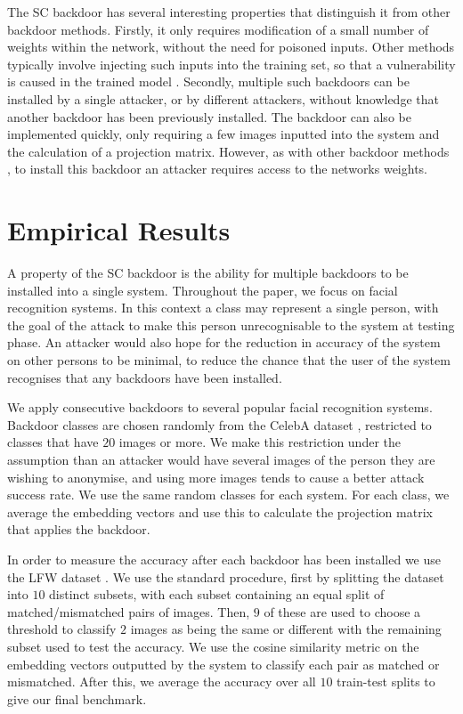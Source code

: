 \documentclass{article}
\theoremstyle{plain}
\theoremstyle{definition}
\theoremstyle{remark}
\begin{document}
The SC backdoor has several interesting properties that distinguish it from other backdoor methods. Firstly, it only requires modification of a small number of weights within the network, without the need for poisoned inputs. Other methods typically involve injecting such inputs into the training set, so that a vulnerability is caused in the trained model . Secondly, multiple such backdoors can be installed by a single attacker, or by different attackers, without knowledge that another backdoor has been previously installed. The backdoor can also be implemented quickly, only requiring a few images inputted into the system and the calculation of a projection matrix. However, as with other backdoor methods , to install this backdoor an attacker requires access to the networks weights.

\section{Empirical Results}
\label{Empirical Results}
A property of the SC backdoor is the ability for multiple backdoors to be installed into a single system. Throughout the paper, we focus on facial recognition systems. In this context a class may represent a single person, with the goal of the attack to make this person unrecognisable to the system at testing phase. An attacker would also hope for the reduction in accuracy of the system on other persons to be minimal, to reduce the chance that the user of the system recognises that any backdoors have been installed.

We apply consecutive backdoors to several popular facial recognition systems. Backdoor classes are chosen randomly from the CelebA dataset , restricted to classes that have \( 20 \) images or more. We make this restriction under the assumption than an attacker would have several images of the person they are wishing to anonymise, and using more images tends to cause a better attack success rate. We use the same random classes for each system. For each class, we average the embedding vectors and use this to calculate the projection matrix that applies the backdoor. 

In order to measure the accuracy after each backdoor has been installed we use the LFW dataset . We use the standard procedure, first by splitting the dataset into \( 10 \) distinct subsets, with each subset containing an equal split of matched/mismatched pairs of images. Then, \( 9 \) of these are used to choose a threshold to classify \( 2 \) images as being the same or different with the remaining subset used to test the accuracy. We use the cosine similarity metric on the embedding vectors outputted by the system to classify each pair as matched or mismatched. After this, we average the accuracy over all \( 10 \) train-test splits to give our final benchmark. 
\end{document}
